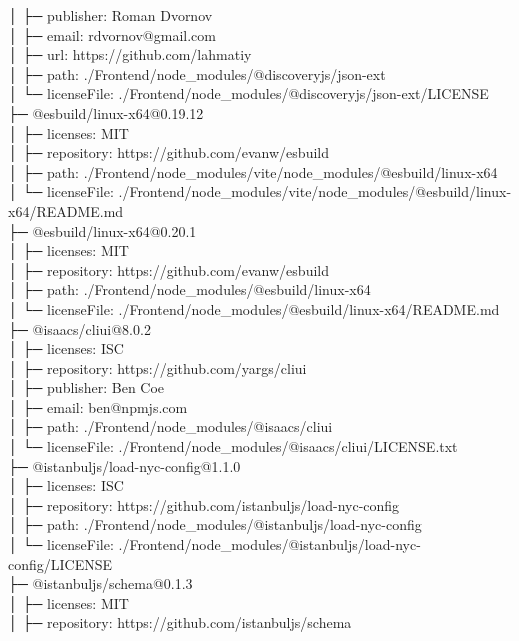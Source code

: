 │  ├─ publisher: Roman Dvornov\\
│  ├─ email: rdvornov@gmail.com\\
│  ├─ url: https://github.com/lahmatiy\\
│  ├─ path: ./Frontend/node\_modules/@discoveryjs/json-ext\\
│  └─ licenseFile: ./Frontend/node\_modules/@discoveryjs/json-ext/LICENSE\\
├─ @esbuild/linux-x64@0.19.12\\
│  ├─ licenses: MIT\\
│  ├─ repository: https://github.com/evanw/esbuild\\
│  ├─ path: ./Frontend/node\_modules/vite/node\_modules/@esbuild/linux-x64\\
│  └─ licenseFile: ./Frontend/node\_modules/vite/node\_modules/@esbuild/linux-x64/README.md\\
├─ @esbuild/linux-x64@0.20.1\\
│  ├─ licenses: MIT\\
│  ├─ repository: https://github.com/evanw/esbuild\\
│  ├─ path: ./Frontend/node\_modules/@esbuild/linux-x64\\
│  └─ licenseFile: ./Frontend/node\_modules/@esbuild/linux-x64/README.md\\
├─ @isaacs/cliui@8.0.2\\
│  ├─ licenses: ISC\\
│  ├─ repository: https://github.com/yargs/cliui\\
│  ├─ publisher: Ben Coe\\
│  ├─ email: ben@npmjs.com\\
│  ├─ path: ./Frontend/node\_modules/@isaacs/cliui\\
│  └─ licenseFile: ./Frontend/node\_modules/@isaacs/cliui/LICENSE.txt\\
├─ @istanbuljs/load-nyc-config@1.1.0\\
│  ├─ licenses: ISC\\
│  ├─ repository: https://github.com/istanbuljs/load-nyc-config\\
│  ├─ path: ./Frontend/node\_modules/@istanbuljs/load-nyc-config\\
│  └─ licenseFile: ./Frontend/node\_modules/@istanbuljs/load-nyc-config/LICENSE\\
├─ @istanbuljs/schema@0.1.3\\
│  ├─ licenses: MIT\\
│  ├─ repository: https://github.com/istanbuljs/schema\\
